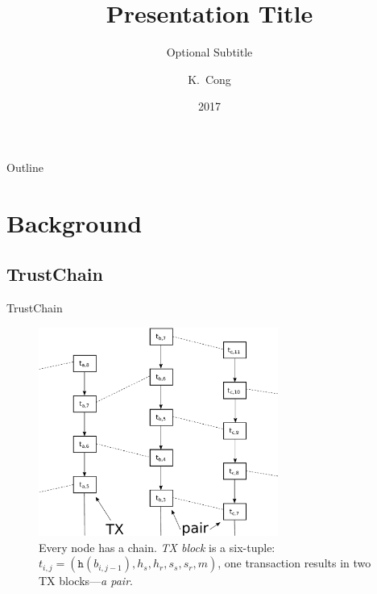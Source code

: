 \documentclass{beamer}
\title{Presentation Title}
\subtitle{Optional Subtitle}
\author{K.~Cong}
\institute[Delft University of Technology] %
{
  Faculty of Electrical Engineering, Mathematics and Computer Science\\
  Delft University of Technology}
\date{2017}
\begin{document}
\begin{frame}
  \titlepage
\end{frame}

\begin{frame}{Outline}
  \tableofcontents
\end{frame}

\section{Background}

\subsection{TrustChain}

\begin{frame}{TrustChain}{}

  \begin{figure}[h]
  \includegraphics[width=0.7\textwidth]{figures/trustchain-good}
  \centering
  \caption{Every node has a chain. \emph{TX block} is a six-tuple: $t_{i,j} =
    (\texttt{h}(b_{i,j-1}), h_s, h_r, s_s, s_r, m)$, one transaction results in
    two TX blocks---\emph{a pair}.}
  \end{figure}

\end{frame}
\end{document}
